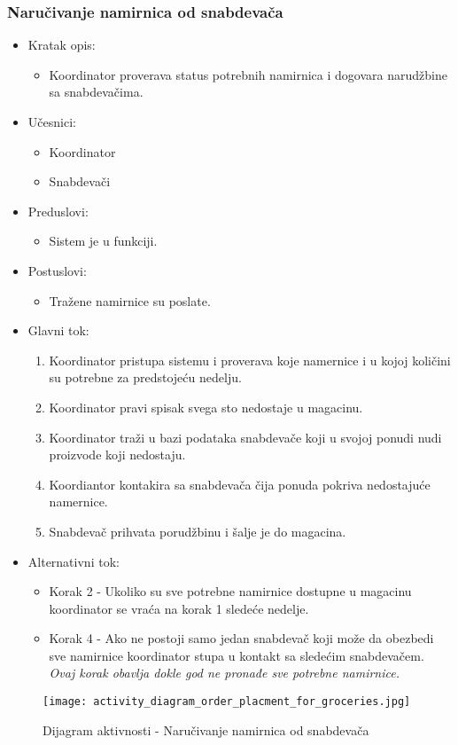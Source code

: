 

\subsubsection{Naručivanje namirnica od snabdevača}


\begin{itemize}
	\item Kratak opis:
		\begin{itemize}
			\item Koordinator proverava status potrebnih namirnica i dogovara narudžbine sa snabdevačima.
		\end{itemize}
	\item Učesnici:
		\begin{itemize}
		    \item Koordinator
		    \item Snabdevači
		\end{itemize}
	\item Preduslovi:
		\begin{itemize}
		   
		    \item Sistem je u funkciji.
		\end{itemize}
	\item Postuslovi:
		\begin{itemize}
			\item Tražene namirnice su poslate.
	\end{itemize}
	\item Glavni tok:
		\begin{enumerate}
            \item	Koordinator pristupa sistemu i proverava koje namernice i u kojoj količini su potrebne za predstojeću nedelju.
           \item Koordinator pravi spisak svega sto nedostaje u magacinu.
            \item Koordinator traži u bazi podataka snabdevače koji u svojoj ponudi nudi proizvode koji nedostaju.
             \item  Koordiantor kontakira sa snabdevača čija ponuda pokriva nedostajuće namernice.
            \item Snabdevač prihvata porudžbinu i šalje je do magacina.
		\end{enumerate}
	\item Alternativni tok:
		\begin{itemize}
		    \item Korak 2 - Ukoliko su sve potrebne namirnice dostupne u magacinu koordinator se vraća na korak 1 sledeće nedelje.
		    \item Korak 4 - Ako ne postoji samo jedan snabdevač koji može da obezbedi sve namirnice koordinator stupa u kontakt sa sledećim snabdevačem. \textit{Ovaj korak obavlja dokle god ne pronađe sve potrebne namirnice.}
		\end{itemize}
\end{itemize}

\begin{figure}[H]
\begin{center}
\texttt{[image: activity\_diagram\_order\_placment\_for\_groceries.jpg]}
\end{center}
    \caption{Dijagram aktivnosti - Naručivanje namirnica od snabdevača}
\label{fig:Activity_diagram_order_placment_for_groceries}
\end{figure}
